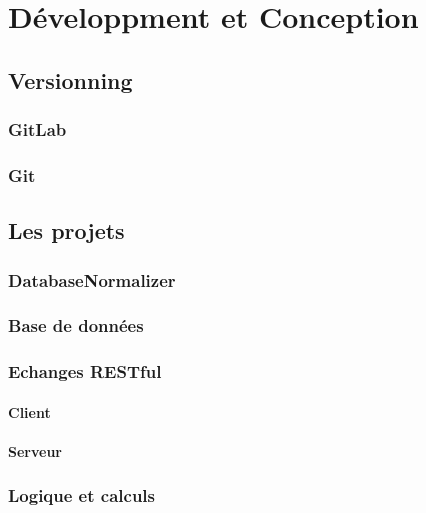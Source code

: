 \documentclass{article}
\begin{document}
\section{Développment et Conception}\label{sec:développment-et-conception}

\subsection{Versionning}\label{subsec:versionning}

\subsubsection{GitLab}

\subsubsection{Git}

\subsection{Les projets}\label{subsec:les-projets}

\subsubsection{DatabaseNormalizer}

\subsubsection{Base de données}

\subsubsection{Echanges RESTful}

\paragraph{Client}

\paragraph{Serveur}

\subsubsection{Logique et calculs}
\end{document}
